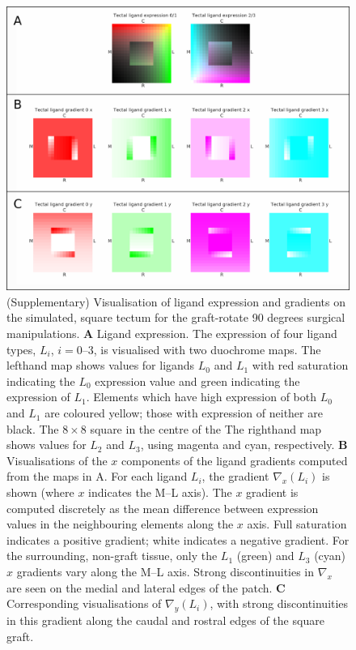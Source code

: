 \documentclass[9pt,lineno]{elife}
\begin{document}

\begin{figure}
\begin{fullwidth}
\includegraphics[width=0.95\linewidth]{./images/Tissuevisb.png}
\caption{(Supplementary) Visualisation of ligand expression and gradients on the simulated, square tectum for the
graft-rotate 90 degrees surgical manipulations. 
\textbf{A} Ligand expression. 
The expression of four ligand types, $L_i$,  $i = 0$--$3$, is visualised with two duochrome maps. 
The lefthand map shows values for ligands $L_0$ and $L_1$ with red saturation indicating the $L_0$ expression value and green indicating the expression of $L_1$. 
Elements which have high expression of both $L_0$ and $L_1$ are coloured yellow; those with expression of neither are black. The $8\times8$ square in the centre of the 
The righthand map shows values for $L_2$ and $L_3$, using magenta and cyan, respectively. 
\textbf{B} Visualisations of the $x$ components of the ligand gradients computed from the maps in A. 
For each ligand $L_i$, the gradient $\nabla_x(L_i)$ is shown (where $x$ indicates the M--L axis). 
The $x$ gradient is computed discretely as the mean difference between expression values in the neighbouring elements along the $x$ axis.
Full saturation indicates a positive gradient; white indicates a negative gradient.
For the surrounding, non-graft tissue, only the $L_1$ (green) and $L_3$ (cyan) $x$ gradients vary along the M--L axis. 
Strong discontinuities in $\nabla_x$ are seen on the medial and lateral edges of the patch.
\textbf{C} Corresponding visualisations of $\nabla_y(L_i)$, with strong discontinuities in this gradient along the caudal and rostral edges of the square graft.}
\label{f:trot90}
\end{fullwidth}
\end{figure}
\end{document}
